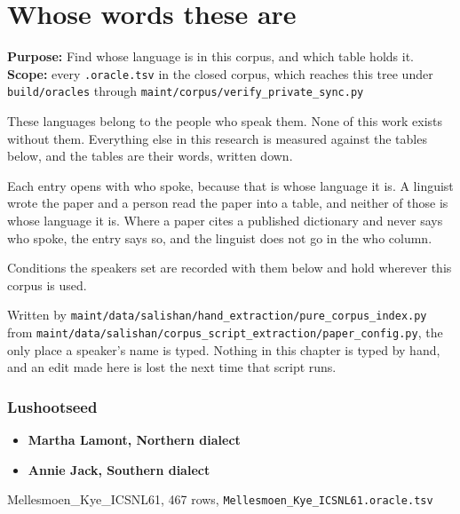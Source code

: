 \chapter{Whose words these are}

\textbf{Purpose:} Find whose language is in this corpus, and which table holds it. \textbf{Scope:} every \texttt{.\allowbreak{}oracle.\allowbreak{}tsv} in the closed corpus, which reaches this tree under \texttt{build/\allowbreak{}oracles} through \texttt{maint/\allowbreak{}corpus/\allowbreak{}verify\_\allowbreak{}private\_\allowbreak{}sync.\allowbreak{}py}

These languages belong to the people who speak them. None of this work exists without them. Everything else in this research is measured against the tables below, and the tables are their words, written down.

Each entry opens with who spoke, because that is whose language it is. A linguist wrote the paper and a person read the paper into a table, and neither of those is whose language it is. Where a paper cites a published dictionary and never says who spoke, the entry says so, and the linguist does not go in the who column.

Conditions the speakers set are recorded with them below and hold wherever this corpus is used.

Written by \texttt{maint/\allowbreak{}data/\allowbreak{}salishan/\allowbreak{}hand\_\allowbreak{}extraction/\allowbreak{}pure\_\allowbreak{}corpus\_\allowbreak{}index.\allowbreak{}py} from \texttt{maint/\allowbreak{}data/\allowbreak{}salishan/\allowbreak{}corpus\_\allowbreak{}script\_\allowbreak{}extraction/\allowbreak{}paper\_\allowbreak{}config.\allowbreak{}py}, the only place a speaker's name is typed. Nothing in this chapter is typed by hand, and an edit made here is lost the next time that script runs.

\subsection{Lushootseed}

\begin{itemize}
\item \textbf{Martha Lamont, Northern dialect}
\item \textbf{Annie Jack, Southern dialect}
\end{itemize}

Mellesmoen\_Kye\_ICSNL61, 467 rows, \texttt{Mellesmoen\_\allowbreak{}Kye\_\allowbreak{}ICSNL61.\allowbreak{}oracle.\allowbreak{}tsv}

